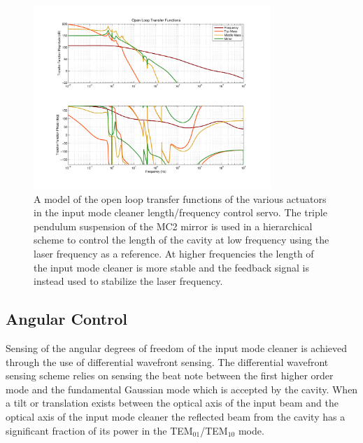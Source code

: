 \begin{figure}
	\centering
	\includegraphics[width=0.8\textwidth,trim = 2.5cm 2cm 2.5cm 1.5cm]{Open_Loop_Tfs.pdf}
	\caption{A model of the open loop transfer functions of the various actuators in the 
		input mode cleaner length/frequency control servo.  
		The triple pendulum suspension of the MC2 mirror is used in a hierarchical scheme to 
		control the length of the cavity at low frequency using the laser frequency as a reference.  
		At higher frequencies the length of the input mode cleaner is more stable and the feedback 
		signal is instead used to stabilize the laser frequency.}
	\label{fig:ControlLoops}
\end{figure}


\subsection{Angular Control}
\label{sec:angular_control}

Sensing of the angular degrees of freedom of the input mode cleaner is achieved through 
the use of differential wavefront sensing\cite{anderson_alignment_1984}\cite{fritschel_alignment_1998}.  
The differential wavefront sensing scheme relies on sensing the beat note between 
the first higher order mode and the fundamental Gaussian mode which is accepted by the cavity.  
When a tilt or translation exists between the optical axis of the input beam and the optical axis 
of the input mode cleaner the reflected beam from the cavity has a significant fraction of its 
power in the TEM$_{01}$/TEM$_{10}$ mode\cite{morrison_automatic_1994}.  

